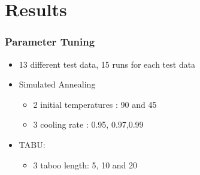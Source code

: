 \documentclass{beamer}
\begin{document}
\section{Results}

\begin{frame}
\frametitle{Parameter Tuning}
\begin{itemize}
\item 13 different test data, 15 runs for each test data
\item Simulated Annealing 
\begin{itemize}
\item 2 initial temperatures : 90 and 45
\item  3 cooling rate : 0.95, 	0.97,0.99
\end{itemize}
\item TABU: 
\begin{itemize}
\item 3 taboo length: 5, 10 and 20
\end{itemize}
\end{itemize}

\end{frame}
\end{document}
